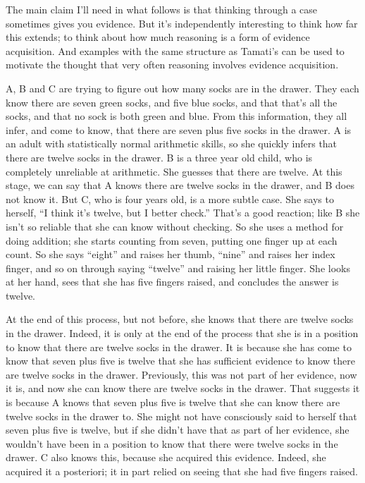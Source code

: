 The main claim I'll need in what follows is that thinking through a case sometimes gives you evidence. But it's independently interesting to think how far this extends; to think about how much reasoning is a form of evidence acquisition. And examples with the same structure as \gls{Tamati}'s can be used to motivate the thought that very often reasoning involves evidence acquisition.

A, B and C are trying to figure out how many socks are in the drawer. They each know there are seven green socks, and five blue socks, and that that's all the socks, and that no sock is both green and blue. From this information, they all infer, and come to know, that there are seven plus five socks in the drawer. A is an adult with statistically normal arithmetic skills, so she quickly infers that there are twelve socks in the drawer. B is a three year old child, who is completely unreliable at arithmetic. She guesses that there are twelve. At this stage, we can say that A knows there are twelve socks in the drawer, and B does not know it. But C, who is four years old, is a more subtle case. She says to herself, ``I think it's twelve, but I better check.'' That's a good reaction; like B she isn't so reliable that she can know without checking. So she uses a method for doing addition; she starts counting from seven, putting one finger up at each count. So she says ``eight'' and raises her thumb, ``nine'' and raises her index finger, and so on through saying ``twelve'' and raising her little finger. She looks at her hand, sees that she has five fingers raised, and concludes the answer is twelve.

At the end of this process, but not before, she knows that there are twelve socks in the drawer. Indeed, it is only at the end of the process that she is in a position to know that there are twelve socks in the drawer. It is because she has come to know that seven plus five is twelve that she has sufficient evidence to know there are twelve socks in the drawer. Previously, this was not part of her evidence, now it is, and now she can know there are twelve socks in the drawer. That suggests it is because A knows that seven plus five is twelve that she can know there are twelve socks in the drawer to. She might not have consciously said to herself that seven plus five is twelve, but if she didn't have that as part of her evidence, she wouldn't have been in a position to know that there were twelve socks in the drawer. C also knows this, because she acquired this evidence. Indeed, she acquired it a posteriori; it in part relied on seeing that she had five fingers raised.

